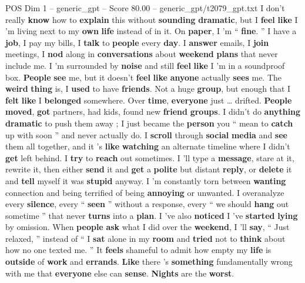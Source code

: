 \begin{textsample}{POS Dim 1 – generic\_gpt – Score 80.00 – generic\_gpt/t2079\_gpt.txt}  \label{ex:f1_pos_014}
I don't really \textbf{know} how to \textbf{explain} this without \textbf{sounding} \textbf{dramatic}, but I \textbf{feel} \textbf{like} I ’m living next to my \textbf{own} \textbf{life} instead of in it.
On \textbf{paper}, I ’m “ \textbf{fine}. ” I have a \textbf{job}, I pay my bills, I \textbf{talk} to \textbf{people} every \textbf{day}.
I \textbf{answer} emails, I \textbf{join} meetings, I \textbf{nod} along in \textbf{conversations} about \textbf{weekend} \textbf{plans} that never include me.
I ’m surrounded by \textbf{noise} and still \textbf{feel} \textbf{like} I ’m in a soundproof box. \textbf{People} \textbf{see} me, but it doesn't \textbf{feel} \textbf{like} \textbf{anyone} actually \textbf{sees} me.
The \textbf{weird} \textbf{thing} is, I \textbf{used} to have \textbf{friends}.
Not a huge \textbf{group}, but enough that I \textbf{felt} \textbf{like} I \textbf{belonged} somewhere.
Over \textbf{time}, \textbf{everyone} just … drifted. \textbf{People} \textbf{moved}, \textbf{got} partners, had kids, found new \textbf{friend} \textbf{groups}.
I didn't do \textbf{anything} \textbf{dramatic} to push them away ; I just became the \textbf{person} you “ mean to \textbf{catch} up with soon ” and never actually do.
I \textbf{scroll} through \textbf{social} \textbf{media} and \textbf{see} them all together, and it ’s \textbf{like} \textbf{watching} an alternate timeline where I didn't \textbf{get} left behind.
I \textbf{try} to \textbf{reach} out sometimes.
I ’ll type a \textbf{message}, stare at it, rewrite it, then either \textbf{send} it and \textbf{get} a \textbf{polite} but distant \textbf{reply}, or \textbf{delete} it and \textbf{tell} myself it was \textbf{stupid} anyway.
I ’m constantly torn between \textbf{wanting} connection and being terrified of being \textbf{annoying} or unwanted.
I overanalyze every \textbf{silence}, every “ \textbf{seen} ” without a response, every “ we should \textbf{hang} out sometime ” that never \textbf{turns} into a \textbf{plan}.
I ’ve also \textbf{noticed} I ’ve \textbf{started} \textbf{lying} by omission.
When \textbf{people} \textbf{ask} what I did over the \textbf{weekend}, I ’ll \textbf{say}, “ Just relaxed, ” instead of “ I \textbf{sat} alone in my \textbf{room} and \textbf{tried} not to \textbf{think} about how no one texted me. ” It \textbf{feels} shameful to admit how empty my \textbf{life} is \textbf{outside} of \textbf{work} and \textbf{errands}. \textbf{Like} there ’s \textbf{something} fundamentally wrong with me that \textbf{everyone} else can \textbf{sense}. \textbf{Nights} are the \textbf{worst}.

\end{textsample}
